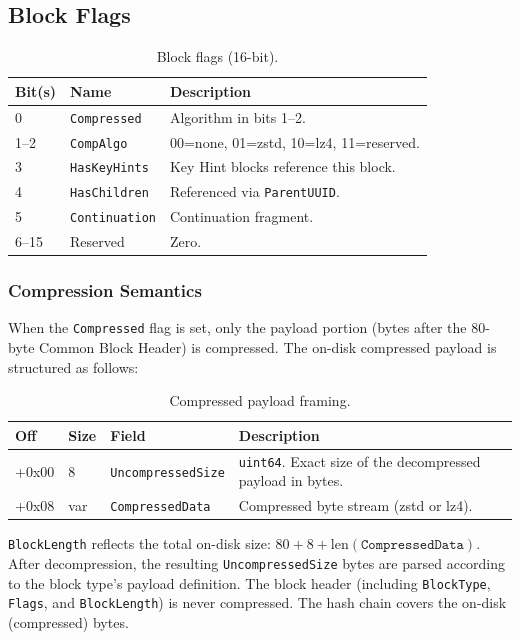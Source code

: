 \documentclass[11pt,a4paper]{article}
\newcommand{\field}[1]{\texttt{#1}}
\begin{document}
\subsection{Block Flags}\label{sec:blockflags}
\begin{table}[H]\centering\caption{Block flags (16-bit).}\label{tab:blockflags}\small
\begin{tabular}{l l p{8.5cm}}\toprule\textbf{Bit(s)}&\textbf{Name}&\textbf{Description}\\\midrule
0 & \field{Compressed} & Algorithm in bits 1--2. \\
1--2 & \field{CompAlgo} & 00=none, 01=zstd, 10=lz4, 11=reserved. \\
3 & \field{HasKeyHints} & Key Hint blocks reference this block. \\
4 & \field{HasChildren} & Referenced via \field{ParentUUID}. \\
5 & \field{Continuation} & Continuation fragment. \\
6--15 & Reserved & Zero. \\\bottomrule
\end{tabular}\end{table}

\subsubsection{Compression Semantics}\label{sec:compression}
When the \field{Compressed} flag is set, only the payload portion (bytes after the 80-byte Common Block Header) is compressed. The on-disk compressed payload is structured as follows:

\begin{table}[H]\centering\caption{Compressed payload framing.}\label{tab:compframing}\small
\begin{tabular}{M M l p{5cm}}\toprule\textbf{Off}&\textbf{Size}&\textbf{Field}&\textbf{Description}\\\midrule
+0x00 & 8 & \field{UncompressedSize} & \texttt{uint64}. Exact size of the decompressed payload in bytes. \\
+0x08 & var & \field{CompressedData} & Compressed byte stream (zstd or lz4). \\\bottomrule
\end{tabular}\end{table}

\noindent\field{BlockLength} reflects the total on-disk size: $80 + 8 + \text{len}(\field{CompressedData})$. After decompression, the resulting \field{UncompressedSize} bytes are parsed according to the block type's payload definition. The block header (including \field{BlockType}, \field{Flags}, and \field{BlockLength}) is never compressed. The hash chain covers the on-disk (compressed) bytes.
\end{document}
